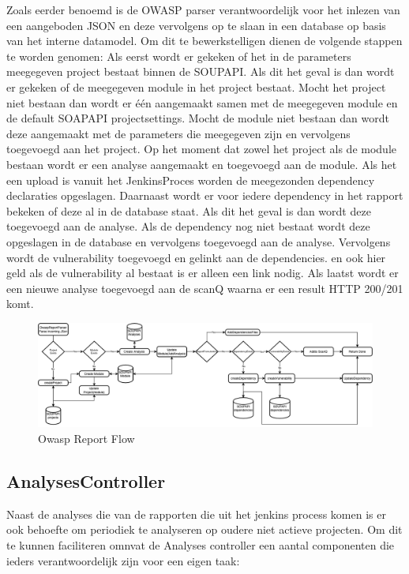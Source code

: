 Zoals eerder benoemd is de OWASP parser verantwoordelijk voor het inlezen van een aangeboden JSON en deze vervolgens op te slaan in een database op basis van het interne datamodel. Om dit te bewerkstelligen dienen de volgende stappen te worden genomen:
Als eerst wordt er gekeken of het in de parameters meegegeven project bestaat binnen de SOUPAPI. Als dit het geval is dan wordt er gekeken of de meegegeven module in het project bestaat. Mocht het project niet bestaan dan wordt er één aangemaakt samen met de meegegeven module en de default SOAPAPI projectsettings. Mocht de module niet bestaan dan wordt deze aangemaakt met de parameters die meegegeven zijn en vervolgens toegevoegd aan het project.
Op het moment dat zowel het project als de module bestaan wordt er een analyse aangemaakt en toegevoegd aan de
module. Als het een upload is vanuit het JenkinsProces worden de meegezonden dependency declaraties opgeslagen. Daarnaast wordt er voor iedere dependency in het rapport bekeken of deze al in de database staat. Als dit het geval is dan wordt deze toegevoegd aan de analyse. Als de dependency nog niet bestaat wordt deze opgeslagen in de database en vervolgens toegevoegd aan de analyse. Vervolgens wordt de vulnerability toegevoegd en gelinkt aan de dependencies. en ook hier geld als de vulnerability al bestaat is er alleen een link nodig.
Als laatst wordt er een nieuwe analyse toegevoegd aan de scanQ waarna er een result HTTP 200/201 komt.
\begin{figure}[bth]
    \myfloatalign
    \includegraphics[width=15cm]{gfx/SOUPAPI-ReportParseFlow}
    \caption{Owasp Report Flow}
    \label{fig:OwaspReportFlow}
\end{figure}

\subsection{AnalysesController}\label{subsec:controller}
Naast de analyses die van de rapporten die uit het jenkins process komen is er ook behoefte om periodiek te analyseren op oudere niet actieve projecten. Om dit te kunnen faciliteren omnvat de Analyses controller een aantal componenten die ieders verantwoordelijk zijn voor een eigen taak:

